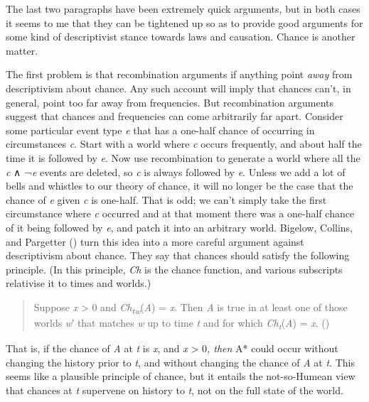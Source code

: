 \documentclass[
  10pt,
  letterpaper,
  DIV=11,
  numbers=noendperiod,
  twoside]{scrartcl}
\begin{document}
The last two paragraphs have been extremely quick arguments, but in both
cases it seems to me that they can be tightened up so as to provide good
arguments for some kind of descriptivist stance towards laws and
causation. Chance is another matter.

The first problem is that recombination arguments if anything point
\emph{away} from descriptivism about chance. Any such account will imply
that chances can't, in general, point too far away from frequencies. But
recombination arguments suggest that chances and frequencies can come
arbitrarily far apart. Consider some particular event type \emph{e} that
has a one-half chance of occurring in circumstances \emph{c}. Start with
a world where \emph{c} occurs frequently, and about half the time it is
followed by \emph{e}. Now use recombination to generate a world where
all the \emph{c} ∧ ¬\emph{e} events are deleted, so \emph{c} is always
followed by \emph{e}. Unless we add a lot of bells and whistles to our
theory of chance, it will no longer be the case that the chance of
\emph{e} given \emph{c} is one-half. That is odd; we can't simply take
the first circumstance where \emph{c} occurred and at that moment there
was a one-half chance of it being followed by \emph{e}, and patch it
into an arbitrary world. Bigelow, Collins, and Pargetter
() turn this idea into a
more careful argument against descriptivism about chance. They say that
chances should satisfy the following principle. (In this principle,
\emph{Ch} is the chance function, and various subscripts relativise it
to times and worlds.)

\begin{quote}
Suppose \emph{x} \textgreater{} 0 and
\emph{Ch\textsubscript{tw}}(\emph{A}) = \emph{x}. Then \emph{A} is true
in at least one of those worlds \emph{w}′ that matches \emph{w} up to
time \emph{t} and for which \emph{Ch\textsubscript{t}}(\emph{A}) =
\emph{x}. ()
\end{quote}

That is, if the chance of \emph{A} at \emph{t} is \emph{x}, and \emph{x}
\textgreater{} 0\emph{, then }A* could occur without changing the
history prior to \emph{t}, and without changing the chance of \emph{A}
at \emph{t}. This seems like a plausible principle of chance, but it
entails the not-so-Humean view that chances at \emph{t} supervene on
history to \emph{t}, not on the full state of the world.
\end{document}
